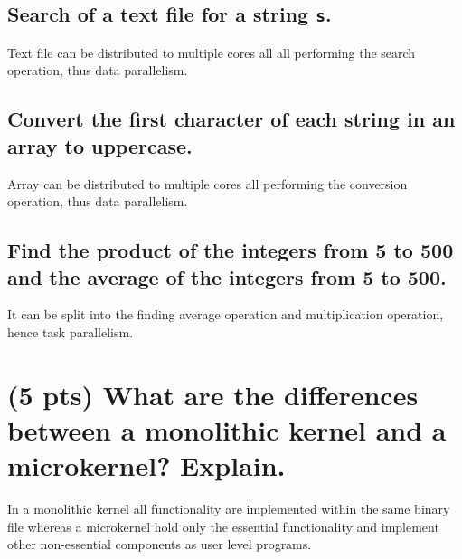 \documentclass{article}
\begin{document}
\subsection{Search of a text file for a string \texttt{s}.}
Text file can be distributed to multiple cores all all performing the search operation, thus data parallelism.

\subsection{Convert the first character of each string in an array to uppercase.}
Array can be distributed to multiple cores all performing the conversion operation, thus data parallelism.

\subsection{Find the product of the integers from 5 to 500 and the average of the integers from 5 to 500.}
It can be split into the finding average operation and multiplication operation, hence task parallelism.

\section{(5 pts) What are the differences between a monolithic kernel and a microkernel?  Explain.}
In a monolithic kernel all functionality are implemented within the same binary file whereas a microkernel hold only the essential functionality and implement other non-essential components as user level programs.
\end{document}
